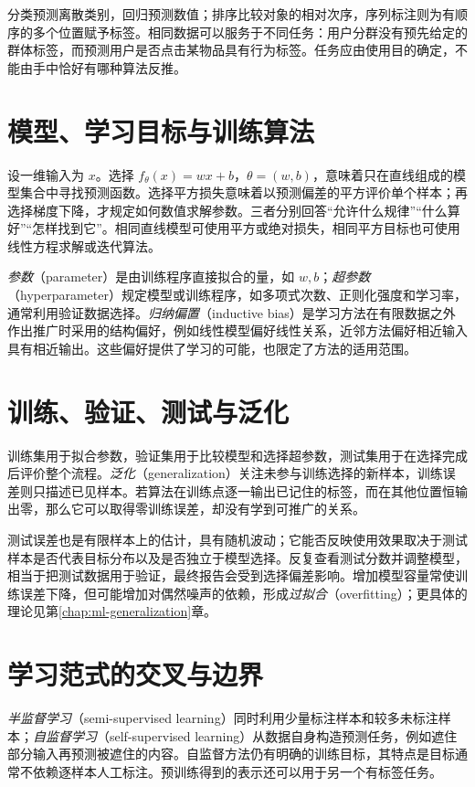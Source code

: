 分类预测离散类别，回归预测数值；排序比较对象的相对次序，序列标注则为有顺序的多个位置赋予标签。相同数据可以服务于不同任务：用户分群没有预先给定的群体标签，而预测用户是否点击某物品具有行为标签。任务应由使用目的确定，不能由手中恰好有哪种算法反推。

\section{模型、学习目标与训练算法}

设一维输入为 $x$。选择 $f_\theta(x)=wx+b$，$\theta=(w,b)$，意味着只在直线组成的模型集合中寻找预测函数。选择平方损失意味着以预测偏差的平方评价单个样本；再选择梯度下降，才规定如何数值求解参数。三者分别回答“允许什么规律”“什么算好”“怎样找到它”。相同直线模型可使用平方或绝对损失，相同平方目标也可使用线性方程求解或迭代算法。

\emph{参数}（parameter）是由训练程序直接拟合的量，如 $w,b$；\emph{超参数}（hyperparameter）规定模型或训练程序，如多项式次数、正则化强度和学习率，通常利用验证数据选择。\emph{归纳偏置}（inductive bias）是学习方法在有限数据之外作出推广时采用的结构偏好，例如线性模型偏好线性关系，近邻方法偏好相近输入具有相近输出。这些偏好提供了学习的可能，也限定了方法的适用范围。

\section{训练、验证、测试与泛化}

训练集用于拟合参数，验证集用于比较模型和选择超参数，测试集用于在选择完成后评价整个流程。\emph{泛化}（generalization）关注未参与训练选择的新样本，训练误差则只描述已见样本。若算法在训练点逐一输出已记住的标签，而在其他位置恒输出零，那么它可以取得零训练误差，却没有学到可推广的关系。

测试误差也是有限样本上的估计，具有随机波动；它能否反映使用效果取决于测试样本是否代表目标分布以及是否独立于模型选择。反复查看测试分数并调整模型，相当于把测试数据用于验证，最终报告会受到选择偏差影响。增加模型容量常使训练误差下降，但可能增加对偶然噪声的依赖，形成\emph{过拟合}（overfitting）；更具体的理论见第\ref{chap:ml-generalization}章。

\section{学习范式的交叉与边界}

\emph{半监督学习}（semi-supervised learning）同时利用少量标注样本和较多未标注样本；\emph{自监督学习}（self-supervised learning）从数据自身构造预测任务，例如遮住部分输入再预测被遮住的内容。自监督方法仍有明确的训练目标，其特点是目标通常不依赖逐样本人工标注。预训练得到的表示还可以用于另一个有标签任务。

